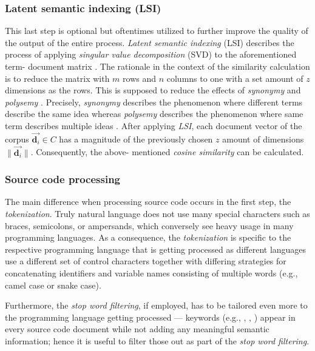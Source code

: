 \documentclass[12pt,a4paper]{report}
\begin{document}
\subsubsection{Latent semantic indexing (LSI)}
This last step is optional but
oftentimes utilized to further improve the quality of the output of the entire
process. \textit{Latent semantic indexing} (LSI) describes the process of
applying \textit{singular value decomposition} (SVD) to the aforementioned term-
document matrix \cite{deerwester1990lsi}. The rationale in the context of the
similarity calculation is to reduce the matrix with \(m\) rows and \(n\)
columns to one with a set amount of \(z\) dimensions as the rows. This is
supposed to reduce the effects of \textit{synonymy} and \textit{polysemy}
\cite{deerwester1990lsi}.
Precisely, \textit{synonymy} describes the phenomenon where
different terms describe the same idea \cite{press2011oxford} whereas
\textit{polysemy} describes the phenomenon where same term describes
multiple ideas \cite{press2011oxford}.
After applying \textit{LSI}, each document vector of
the corpus \(\vec{\mathbf d_i} \in C\) has a magnitude of the previously chosen
\(z\) amount of dimensions \(\|\vec{\mathbf d_i}\|\). Consequently, the above-
mentioned \textit{cosine similarity} can be calculated.


\subsubsection{Source code processing}
The main difference when processing
source code occurs in the first step, the \textit{tokenization}. Truly natural
language does not use many special characters such as braces, semicolons, or
ampersands, which conversely see heavy usage in many programming languages. As
a consequence, the \textit{tokenization} is specific to the respective
programming language that is getting processed as different languages use a
different set of control characters together with differing strategies for
concatenating identifiers and variable names consisting of multiple words
(e.g., camel case or snake case).

Furthermore, the \textit{stop word filtering}, if employed, has to be tailored
even more to the programming language getting processed --- keywords (e.g.,
, , ) appear in every source code document
while not adding any meaningful semantic information; hence it is useful to
filter those out as part of the \textit{stop word filtering}.
\end{document}
